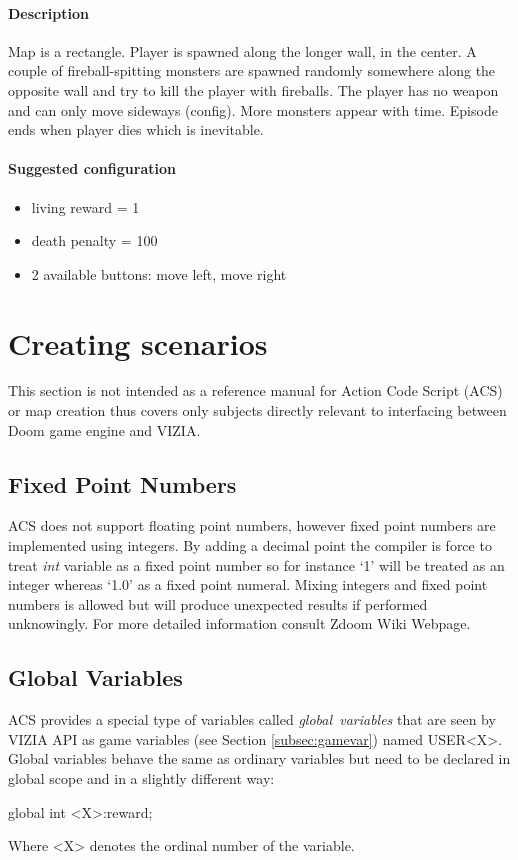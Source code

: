 		\paragraph{Description}
			Map is a rectangle. Player is spawned along the longer wall, in the center. A couple of fireball-spitting monsters are spawned randomly somewhere along the opposite wall and try to kill the player with fireballs. The player has no weapon and can only move sideways (config). More monsters appear with time. Episode ends when player dies which is inevitable.

		\paragraph{Suggested configuration}
		\begin{itemize}
			\item living reward = 1
			\item death penalty = 100
			\item 2 available buttons: move left, move right
		\end{itemize}
	\newpage

\section{Creating scenarios}\label{sec:creating_scenarios}
	This section is not intended as a reference manual for Action Code Script (ACS) or map creation thus covers only subjects directly relevant to interfacing between Doom game engine and VIZIA.


	\subsection{Fixed Point Numbers}\label{subsec:fixed_point}
		ACS does not support floating point numbers, however fixed point numbers are implemented using integers. By adding a decimal point the compiler is force to treat \emph{int} variable as a fixed point number so for instance `1' will be treated as an integer whereas `1.0' as a fixed point numeral. Mixing integers and fixed point numbers is allowed but will produce unexpected results if performed unknowingly. For more detailed information consult Zdoom Wiki Webpage\cite{zdoom-wiki}.

	\subsection{Global Variables}\label{subsec:global_variable}
		ACS provides a special type of variables called \emph{global~variables} that are seen by VIZIA API as game variables (see Section \ref{subsec:gamevar}) named USER<X>. Global variables behave the same as ordinary variables but need to be declared in global scope and in a slightly different way:
		\begin{clinee}
global int <X>:reward;
		\end{clinee}
		Where <X> denotes the ordinal number of the variable.
		
